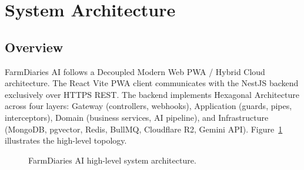 \documentclass[conference]{IEEEtran}
\begin{document}
\section{System Architecture}

\subsection{Overview}

FarmDiaries AI follows a Decoupled Modern Web PWA / Hybrid Cloud architecture. The React Vite PWA client communicates with the NestJS backend exclusively over HTTPS REST. The backend implements Hexagonal Architecture across four layers: Gateway (controllers, webhooks), Application (guards, pipes, interceptors), Domain (business services, AI pipeline), and Infrastructure (MongoDB, pgvector, Redis, BullMQ, Cloudflare R2, Gemini API). Figure~\ref{fig:arch} illustrates the high-level topology.

\begin{figure}[htbp]
\centering
{}
\caption{FarmDiaries AI high-level system architecture.}
\label{fig:arch}
\end{figure}
\end{document}
